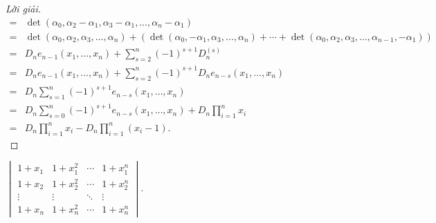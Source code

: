 \documentclass[class=linear-algebra,crop=false]{standalone}
\begin{document}
\begin{proof}[Lời giải]
\begin{align*}
		= & \det(\alpha_{0}, \alpha_{2} - \alpha_{1}, \alpha_{3} - \alpha_{1}, \ldots, \alpha_{n} - \alpha_{1})                                                                                                                              \\
		= & \det(\alpha_{0}, \alpha_{2}, \alpha_{3}, \ldots, \alpha_{n}) + \left(\det(\alpha_{0}, -\alpha_{1}, \alpha_{3}, \ldots, \alpha_{n}) + \cdots + \det(\alpha_{0}, \alpha_{2}, \alpha_{3}, \ldots, \alpha_{n-1}, -\alpha_{1})\right) \\
		= & D_{n}e_{n-1}(x_{1}, \ldots, x_{n}) + \sum^{n}_{s=2}{(-1)}^{s+1}D^{(s)}_{n}                                                                                                                                                       \\
		= & D_{n}e_{n-1}(x_{1}, \ldots, x_{n}) + \sum^{n}_{s=2}{(-1)}^{s+1}D_{n}e_{n-s}(x_{1}, \ldots, x_{n})                                                                                                                                \\
		= & D_{n}\sum^{n}_{s=1}{(-1)}^{s+1}e_{n-s}(x_{1}, \ldots, x_{n})                                                                                                                                                                     \\
		= & D_{n}\sum^{n}_{s=0}{(-1)}^{s+1}e_{n-s}(x_{1}, \ldots, x_{n}) + D_{n}\prod^{n}_{i=1}x_{i}                                                                                                                                         \\
		= & D_{n}\prod^{n}_{i=1}x_{i} - D_{n}\prod^{n}_{i=1}(x_{i} - 1).
	\end{align*}
	\endgroup{}
\end{proof}

\begin{exercise}
	$\begin{vmatrix}
			1 + x_{1} & 1 + x_{1}^{2} & \cdots & 1 + x_{1}^{n} \\
			1 + x_{2} & 1 + x_{2}^{2} & \cdots & 1 + x_{2}^{n} \\
			\vdots    & \vdots        & \ddots & \vdots        \\
			1 + x_{n} & 1 + x_{n}^{2} & \cdots & 1 + x_{n}^{n}
		\end{vmatrix}$.
\end{exercise}
\end{document}
